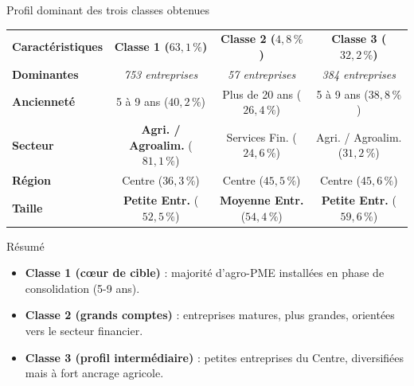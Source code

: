 \documentclass[aspectratio=169, 10pt]{beamer}
\begin{document}
\begin{frame}{Profil dominant des trois classes obtenues}
    \begin{center}
        \scriptsize
        \renewcommand{\arraystretch}{1.2}
        \begin{tabular}{l|c|c|c}
            \toprule
            \textbf{Caractéristiques} & \textbf{Classe 1 ($63,1\,\%$)} & \textbf{Classe 2 ($4,8\,\%$)} & \textbf{Classe 3 ($32,2\,\%$)} \\
            \textbf{Dominantes} & \textit{753 entreprises} & \textit{57 entreprises} & \textit{384 entreprises} \\
            \midrule
            \textbf{Ancienneté} & 5 à 9 ans ($40,2\,\%$) & Plus de 20 ans ($26,4\,\%$) & 5 à 9 ans ($38,8\,\%$) \\
            \rowcolor{gray!5}
            \textbf{Secteur} & \textbf{Agri. / Agroalim.} ($81,1\,\%$) & Services Fin. ($24,6\,\%$) & Agri. / Agroalim. ($31,2\,\%$) \\
            \textbf{Région} & Centre ($36,3\,\%$) & Centre ($45,5\,\%$) & Centre ($45,6\,\%$) \\
            \rowcolor{gray!5}
            \textbf{Taille} & \alert{\textbf{Petite Entr.}} ($52,5\,\%$) & \alert{\textbf{Moyenne Entr.}} ($54,4\,\%$) & \alert{\textbf{Petite Entr.}} ($59,6\,\%$) \\
            \bottomrule
        \end{tabular}
    \end{center}
    \begin{block}{Résumé}
        \begin{itemize}
            \tiny
            \item \textbf{Classe 1 (cœur de cible)} : majorité d'agro-PME installées en phase de consolidation (5-9 ans).
            \item \textbf{Classe 2 (grands comptes)} : entreprises matures, plus grandes, orientées vers le secteur financier.
            \item \textbf{Classe 3 (profil intermédiaire)} : petites entreprises du Centre, diversifiées mais à fort ancrage agricole.
        \end{itemize}
    \end{block}
\end{frame}
\end{document}
